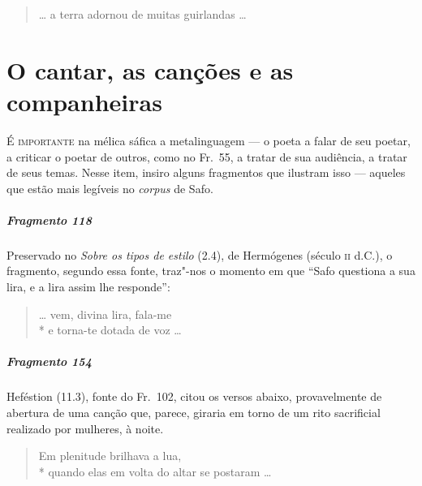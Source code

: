 \begin{verse}
\ldots{} a terra adornou de muitas guirlandas \ldots{}
\end{verse}


\chapter[O cantar, as canções e as companheiras]{O cantar, as canções e as companheiras}


\textsc{É importante} na mélica sáfica a metalinguagem --- o poeta a falar de seu
poetar, a criticar o poetar de outros, como no Fr.~55, a tratar de sua
audiência, a tratar de seus temas. Nesse item, insiro alguns fragmentos que
ilustram isso --- aqueles que estão mais legíveis no \textit{corpus} de Safo.


\paragraph{Fragmento 118}

{\small Preservado no \textit{Sobre os tipos de estilo} (2.4), de Hermógenes (século \textsc{ii} d.C.),
o fragmento, segundo essa fonte, traz"-nos o momento em que ``Safo
questiona a sua lira, e a lira assim lhe responde”:}

\begin{verse}
\ldots{} vem, divina lira, fala-me\\*
e torna-te dotada de voz \ldots{}
\end{verse}


\paragraph{Fragmento 154}

{\small Heféstion (11.3), fonte do Fr.~102, citou os versos abaixo, provavelmente de abertura
de uma canção que, parece, giraria em torno de um rito sacrificial realizado
por mulheres, à noite.}

\begin{verse}
Em plenitude brilhava a lua, \\*
quando elas em volta do altar se postaram \ldots{}
\end{verse}

